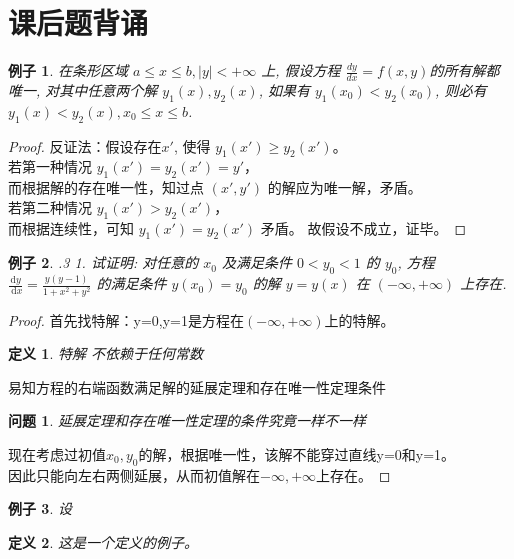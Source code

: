 \documentclass[12pt, a4paper]{article}
\newtheorem{definition}{定义}[section]
\newtheorem{example}{例子}[section]
\newtheorem{question}{问题}[section]
\begin{document}
\section{课后题背诵}
\begin{example}
在条形区域 $a \leqslant x \leqslant b,|y|<+\infty$ 上, 
假设方程 $\frac{dy}{dx} = f(x, y)$的所有解都唯一, 对其中任意两个解 $y_1(x), y_2(x)$, 
如果有 $y_1\left(x_0\right)<y_2\left(x_0\right)$, 
则必有 $y_1(x)<y_2(x), x_0 \leqslant x \leqslant b$.
\end{example}
\begin{proof}
    反证法：假设存在$x{\prime}$,
    使得 \(y_1\left(x'\right) \geq y_2\left(x'\right)\)。\\
    若第一种情况 \(y_1\left(x'\right) = y_2\left(x'\right) = y'\)，\\
    而根据解的存在唯一性，知过点 \((x', y')\) 的解应为唯一解，矛盾。\\
    若第二种情况 \(y_1\left(x'\right) > y_2\left(x'\right)\)，\\
    而根据连续性，可知 \(y_1\left(x'\right) = y_2\left(x'\right)\) 矛盾。    
    故假设不成立，证毕。
\end{proof}
\begin{example}
    .3 1. 试证明: 对任意的 $x_0$ 及满足条件 $0<y_0<1$ 的 $y_0$, 
    方程 $\frac{\mathrm{d} y}{\mathrm{~d} x}=\frac{y(y-1)}{1+x^2+y^2}$ 的满足条件 $y\left(x_0\right)=y_0$ 的解
     $y=y(x)$ 在 $(-\infty,+\infty)$ 上存在.
\end{example}   
\begin{proof}
   首先找特解：y=0,y=1是方程在$(-\infty,+\infty)$上的特解。\\
   \begin{definition}特解
    不依赖于任何常数
    \end{definition}
    易知方程的右端函数满足解的延展定理和存在唯一性定理条件\\
    \begin{question}
        延展定理和存在唯一性定理的条件究竟一样不一样
    \end{question}
    现在考虑过初值\(x_0, y_0\)的解，根据唯一性，该解不能穿过直线y=0和y=1。\\
    因此只能向左右两侧延展，从而初值解在\(-\infty,+\infty\)上存在。
\end{proof}
\begin{example}
    设
\end{example}
\begin{definition}
    这是一个定义的例子。
\end{definition}
\end{document}
